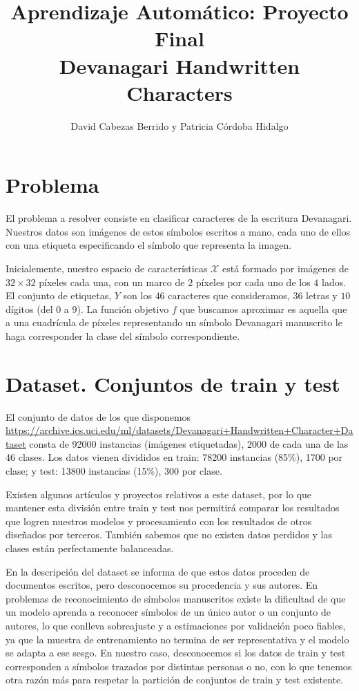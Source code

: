 \documentclass[a4]{article}
\title{Aprendizaje Automático: Proyecto Final \\ Devanagari Handwritten Characters}
\author{David Cabezas Berrido y Patricia Córdoba Hidalgo}
\date{}
\begin{document}
\maketitle
\tableofcontents

\newpage

\section{Problema}

El problema a resolver consiste en clasificar caracteres de la
escritura Devanagari. Nuestros datos son imágenes de estos símbolos
escritos a mano, cada uno de ellos con una etiqueta especificando el
símbolo que representa la imagen.

Inicialemente, nuestro espacio de características $\mathcal{X}$ está
formado por imágenes de $32 \times 32$ píxeles cada una, con un marco
de $2$ píxeles por cada uno de los $4$ lados. El conjunto de
etiquetas, $Y$ son los $46$ caracteres que consideramos, $36$ letras y
$10$ dígitos (del $0$ a $9$). La función objetivo $f$ que buscamos
aproximar es aquella que a una cuadrícula de píxeles representando un
símbolo Devanagari manuscrito le haga corresponder la clase del
símbolo correspondiente.

\section{Dataset. Conjuntos de train y test}

El conjunto de datos de los que disponemos \\
\href{https://archive.ics.uci.edu/ml/datasets/Devanagari+Handwritten+Character+Dataset}{https://archive.ics.uci.edu/ml/datasets/Devanagari+Handwritten+Character+Dataset}
consta de 92000 instancias (imágenes etiquetadas), 2000 de cada una de
las 46 clases. Los datos vienen divididos en train: 78200 instancias
(85\%), 1700 por clase; y test: 13800 instancias (15\%), 300 por
clase.

Existen algunos artículos y proyectos relativos a este dataset, por lo
que mantener esta división entre train y test nos permitirá
comparar los resultados que logren nuestros modelos y procesamiento
con los resultados de otros diseñados por terceros.
También sabemos que no existen datos perdidos y las clases están
perfectamente balanceadas.

En la descripción del dataset se informa de que estos datos proceden
de documentos escritos, pero desconocemos su procedencia y sus
autores. En problemas de reconocimiento de símbolos manuscritos existe
la dificultad de que un modelo aprenda a reconocer símbolos de un
único autor o un conjunto de autores, lo que conlleva sobreajuste y a
estimaciones por validación poco fiables, ya que la muestra de
entrenamiento no termina de ser representativa y el modelo se adapta a
ese sesgo. En nuestro caso, desconocemos si los datos de train y test
corresponden a símbolos trazados por distintas personas o no, con lo
que tenemos otra razón más para respetar la partición de conjuntos de
train y test existente.
\end{document}
